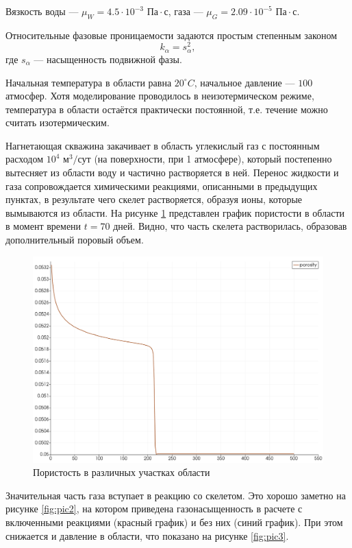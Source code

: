 \documentclass[14pt,a4paper]{extarticle}
\begin{document}
Вязкость воды --- ${\mu}_W = 4.5 \cdot 10^{-3} \text{ Па} \cdot \text{с}$, газа --- $\mu_G = 2.09\cdot 10^{-5} \text{ Па} \cdot \text{с}$.

Относительные фазовые проницаемости задаются простым степенным законом $$k_{\alpha} = s_{\alpha}^2,$$ где $s_{\alpha}$ --- насыщенность подвижной фазы.

Начальная температура в области равна $20^\circ C$, начальное давление --- $100$ атмосфер. Хотя моделирование проводилось в неизотермическом режиме, температура в области остаётся практически постоянной, т.е. течение можно считать изотермическим.

Нагнетающая скважина закачивает в область углекислый газ с постоянным расходом $10^4 \text{ м}^3/\text{сут}$ (на поверхности, при 1 атмосфере), который постепенно вытесняет из области воду и частично растворяется в ней. Перенос жидкости и газа сопровождается химическими реакциями, описанными в предыдущих пунктах, в результате чего скелет растворяется, образуя ионы, которые вымываются из области. На рисунке \ref{fig:pic1} представлен график пористости в области в момент времени $t = 70\text{ дней}$. Видно, что часть скелета растворилась, образовав дополнительный поровый объем.

\begin{figure}[h!]
\centering
\includegraphics[width=.75\textwidth]{porosity}
\caption{Пористость в различных участках области} \label{fig:pic1}
\end{figure}

Значительная часть газа вступает в реакцию со скелетом. Это хорошо заметно на рисунке \ref{fig:pic2}, на котором приведена газонасыщенность в расчете с включенными реакциями (красный график) и без них (синий график).
При этом снижается и давление в области, что показано на рисунке \ref{fig:pic3}.
\end{document}
